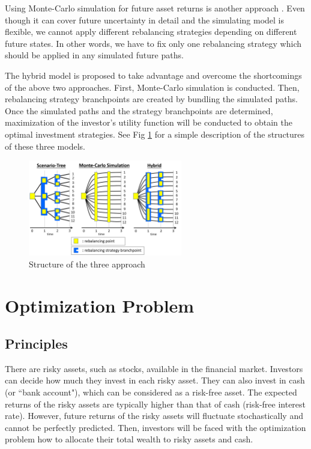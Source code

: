 \documentclass[11t]{article}
\begin{document}
Using Monte-Carlo simulation for future asset returns is another approach \cite{sim}. Even though it can cover future uncertainty in detail and the simulating model is flexible, 
we cannot apply different rebalancing strategies depending on different future states. In other words, we have to fix only one rebalancing strategy which should be applied in any simulated future paths.

The hybrid model \cite{hybrid} is proposed to take advantage and overcome the shortcomings of the above two approaches.
First, Monte-Carlo simulation is conducted. Then, rebalancing strategy branchpoints are created by bundling the simulated paths.
Once the simulated paths and the strategy branchpoints are determined, maximization of the investor's utility function will be conducted to obtain the optimal investment strategies.
See Fig \ref{str} for a simple description of the structures of these three models.

\begin{figure}[htbp]
\centering
\includegraphics[width=0.6\textwidth]{structure.png}
\caption{Structure of the three approach}
\label{str}
\end{figure}

\section{Optimization Problem}
\subsection{Principles}
There are risky assets, such as stocks, available in the financial market. Investors can decide how much they invest in each risky asset. They can also invest in cash (or ``bank account"), which can be considered as a risk-free asset. The expected returns of the risky assets are typically higher than that of cash (risk-free interest rate). However, future returns of the risky assets will fluctuate stochastically and cannot be perfectly predicted. Then, investors will be faced with the optimization problem how to allocate their total wealth to risky assets and cash.
\end{document}
